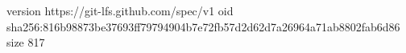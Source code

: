 version https://git-lfs.github.com/spec/v1
oid sha256:816b98873be37693ff79794904b7e72fb57d2d62d7a26964a71ab8802fab6d86
size 817
